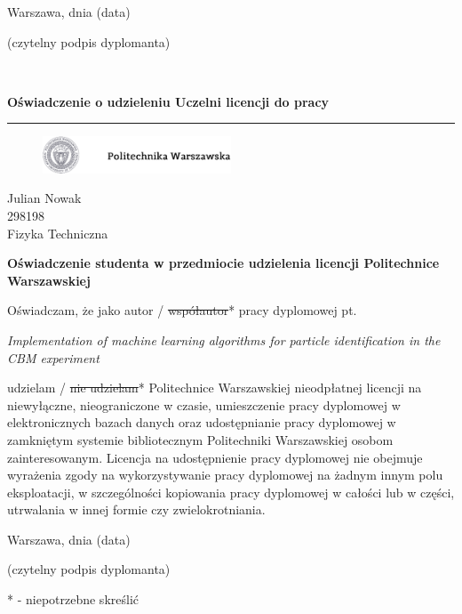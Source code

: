 \vspace{3cm}

\begin{multicols}{2}
	\begin{flushleft}
		Warszawa, dnia (data)
	\end{flushleft}
	\begin{flushright}
		(czytelny podpis dyplomanta)
	\end{flushright}
\end{multicols}

\newpage
\mbox{ }

\newpage
{\large \textbf{Oświadczenie o udzieleniu Uczelni licencji do pracy}}\\
{\color{sliwka}\rule[1pt]{\textwidth}{1.5pt}}

\vspace{0.6cm}

\begin{figure}[h]
	\includegraphics[width=0.5\textwidth]{img/pw_logo_tekst.png}
\end{figure}

\vspace{0.6cm}
{\large Julian Nowak}\\
298198\\
Fizyka Techniczna\\

\begin{center}
	{\large \textbf{Oświadczenie studenta w przedmiocie udzielenia licencji Politechnice Warszawskiej}}
\end{center}


Oświadczam, że jako autor / \sout{współautor}* pracy dyplomowej pt.
\begin{center}
\textit{Implementation of machine learning algorithms for particle identification in the CBM experiment}
\end{center}
udzielam / \sout{nie udzielam}* Politechnice Warszawskiej nieodpłatnej licencji na niewyłączne, nieograniczone w czasie, umieszczenie pracy dyplomowej w elektronicznych bazach danych oraz udostępnianie pracy dyplomowej w zamkniętym systemie bibliotecznym Politechniki Warszawskiej osobom zainteresowanym.
Licencja na udostępnienie pracy dyplomowej nie obejmuje wyrażenia zgody na wykorzystywanie pracy dyplomowej na żadnym innym polu eksploatacji, w szczególności kopiowania pracy dyplomowej w całości lub w części, utrwalania w innej formie czy zwielokrotniania.

\vspace{3cm}

\begin{multicols}{2}
	\begin{flushleft}
		Warszawa, dnia (data)
	\end{flushleft}
	\begin{flushright}
		(czytelny podpis dyplomanta)
	\end{flushright}
\end{multicols}
* - niepotrzebne skreślić

\newpage
\mbox{ }

